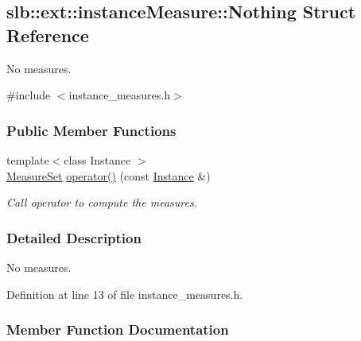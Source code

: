 \hypertarget{structslb_1_1ext_1_1instanceMeasure_1_1Nothing}{}\subsection{slb\+:\+:ext\+:\+:instance\+Measure\+:\+:Nothing Struct Reference}
\label{structslb_1_1ext_1_1instanceMeasure_1_1Nothing}


No measures.  




{\ttfamily \#include $<$instance\+\_\+measures.\+h$>$}

\subsubsection*{Public Member Functions}
\begin{DoxyCompactItemize}
\item 
{\footnotesize template$<$class Instance $>$ }\\\hyperlink{structslb_1_1core_1_1sb_1_1MeasureSet}{Measure\+Set} \hyperlink{structslb_1_1ext_1_1instanceMeasure_1_1Nothing_a71868db5321de025fb07e8d63dcf7642}{operator()} (const \hyperlink{structslb_1_1core_1_1sb_1_1Instance}{Instance} \&)
\begin{DoxyCompactList}\small\item\em Call operator to compute the measures. \end{DoxyCompactList}\end{DoxyCompactItemize}


\subsubsection{Detailed Description}
No measures. 

Definition at line 13 of file instance\+\_\+measures.\+h.



\subsubsection{Member Function Documentation}
